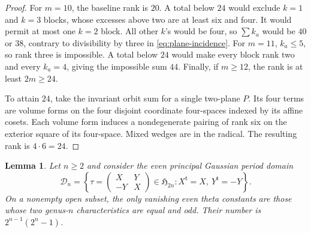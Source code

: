 \documentclass[11pt]{article}
\newtheorem{lemma}[theorem]{Lemma}
\theoremstyle{definition}
\theoremstyle{remark}
\begin{document}
\begin{proof}
For $m=10$, the baseline rank is $20$. A total below $24$ would exclude $k=1$ and $k=3$ blocks, whose excesses above two are at least six and four. It would permit at most one $k=2$ block. All other $k$'s would be four, so $\sum k_a$ would be $40$ or $38$, contrary to divisibility by three in \eqref{eq:plane-incidence}. For $m=11$, $k_a\le5$, so rank three is impossible. A total below $24$ would make every block rank two and every $k_a=4$, giving the impossible sum $44$. Finally, if $m\ge12$, the rank is at least $2m\ge24$.

To attain $24$, take the invariant orbit sum for a single two-plane $P$. Its four terms are volume forms on the four disjoint coordinate four-spaces indexed by its affine cosets. Each volume form induces a nondegenerate pairing of rank six on the exterior square of its four-space. Mixed wedges are in the radical. The resulting rank is $4\cdot6=24$.
\end{proof}

\begin{lemma}\label{lem:generic-gaussian-theta-nulls}
Let $n\ge2$ and consider the even principal Gaussian period domain
\[
 \mathcal D_n=
 \left\{\tau=
 \begin{pmatrix}X&Y\\-Y&X\end{pmatrix}\in\mathfrak H_{2n}:
 X^{\mathsf t}=X,\ Y^{\mathsf t}=-Y\right\}.
\]
On a nonempty open subset, the only vanishing even theta constants
are those whose two genus-$n$ characteristics are equal and odd.
Their number is $2^{n-1}(2^n-1)$.
\end{lemma}
\end{document}
